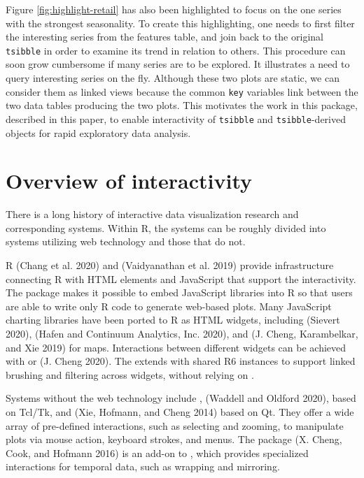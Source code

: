 Figure \ref{fig:highlight-retail} has also been highlighted to focus on the one series with the strongest seasonality. To create this highlighting, one needs to first filter the interesting series from the features table, and join back to the original \texttt{tsibble} in order to examine its trend in relation to others. This procedure can soon grow cumbersome if many series are to be explored. It illustrates a need to query interesting series on the fly. Although these two plots are static, we can consider them as linked views because the common \texttt{key} variables link between the two data tables producing the two plots. This motivates the work in this package, described in this paper, to enable interactivity of \texttt{tsibble} and \texttt{tsibble}-derived objects for rapid exploratory data analysis.

\hypertarget{overview-of-interactivity}{%
\section{Overview of interactivity}\label{overview-of-interactivity}}

There is a long history of interactive data visualization research and corresponding systems. Within R, the systems can be roughly divided into systems utilizing web technology and those that do not.

R  (Chang et al. 2020) and  (Vaidyanathan et al. 2019) provide infrastructure connecting R with HTML elements and JavaScript that support the interactivity. The  package makes it possible to embed JavaScript libraries into R so that users are able to write only R code to generate web-based plots. Many JavaScript charting libraries have been ported to R as HTML widgets, including  (Sievert 2020),  (Hafen and Continuum Analytics, Inc. 2020), and  (J. Cheng, Karambelkar, and Xie 2019) for maps. Interactions between different widgets can be achieved with  or  (J. Cheng 2020). The  extends  with shared R6 instances to support linked brushing and filtering across widgets, without relying on .

Systems without the web technology include ,  (Waddell and Oldford 2020), based on Tcl/Tk, and  (Xie, Hofmann, and Cheng 2014) based on Qt. They offer a wide array of pre-defined interactions, such as selecting and zooming, to manipulate plots via mouse action, keyboard strokes, and menus. The  package (X. Cheng, Cook, and Hofmann 2016) is an add-on to , which provides specialized interactions for temporal data, such as wrapping and mirroring.

